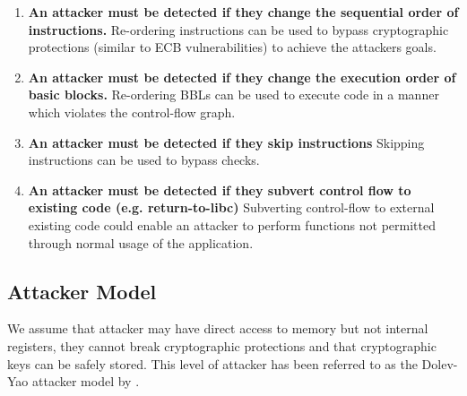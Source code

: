 \begin{enumerate}
	\item \textbf{An attacker must be detected if they change the sequential order of instructions.} Re-ordering instructions can be used to bypass cryptographic protections (similar to ECB vulnerabilities) to achieve the attackers goals.
	\item \textbf{An attacker must be detected if they change the execution order of basic blocks.} Re-ordering BBLs can be used to execute code in a manner which violates the control-flow graph.
	\item \textbf{An attacker must be detected if they skip instructions} Skipping instructions can be used to bypass checks.
	\item \textbf{An attacker must be detected if they subvert control flow to existing code (e.g. return-to-libc)} Subverting control-flow to external existing code could enable an attacker to perform functions not permitted through normal usage of the application.
\end{enumerate}

\subsection{Attacker Model}
We assume that attacker may have direct access to memory but not internal registers, they cannot break cryptographic protections and that cryptographic keys can be safely stored. This level of attacker has been referred to as the Dolev-Yao attacker model \cite{Dolev1981} by \cite{Lee2019}.